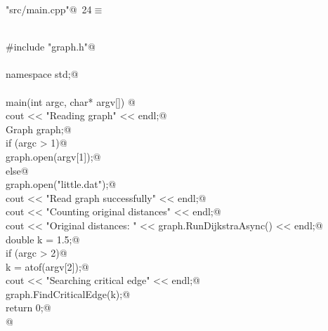 \documentclass[12pt]{article}
\begin{document}
\begin{flushleft} \small
\begin{minipage}{\linewidth}\label{scrap42}\raggedright\small
{} \verb@"src/main.cpp"@\nobreak\ {\footnotesize {24}}$\equiv$
\vspace{-1ex}
\begin{list}{}{} \item
\mbox{}\verb@@\\
\mbox{}\verb@#include "graph.h"@\\
\mbox{}\verb@@\\
\mbox{}\verb@using namespace std;@\\
\mbox{}\verb@@\\
\mbox{}\verb@int main(int argc, char* argv[]) {@\\
\mbox{}\verb@    cout << "Reading graph" << endl;@\\
\mbox{}\verb@    Graph graph;@\\
\mbox{}\verb@    if (argc > 1)@\\
\mbox{}\verb@        graph.open(argv[1]);@\\
\mbox{}\verb@    else@\\
\mbox{}\verb@        graph.open("little.dat");@\\
\mbox{}\verb@    cout << "Read graph successfully" << endl;@\\
\mbox{}\verb@    cout << "Counting original distances" << endl;@\\
\mbox{}\verb@    cout << "Original distances: " << graph.RunDijkstraAsync() << endl;@\\
\mbox{}\verb@    double k = 1.5;@\\
\mbox{}\verb@    if (argc > 2)@\\
\mbox{}\verb@        k = atof(argv[2]);@\\
\mbox{}\verb@    cout << "Searching critical edge" << endl;@\\
\mbox{}\verb@    graph.FindCriticalEdge(k);@\\
\mbox{}\verb@    return 0;@\\
\mbox{}\verb@}@\\
\mbox{}\verb@@{\NWsep}
\end{list}
\vspace{-1.5ex}
\footnotesize
\begin{list}{}{\setlength{\itemsep}{-\parsep}\setlength{\itemindent}{-\leftmargin}}

\item{}
\end{list}
\end{minipage}\vspace{4ex}
\end{flushleft}
\end{document}
